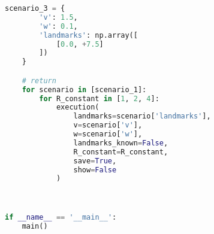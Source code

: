 \documentclass[../CSC_5RO12_TA_TP4.tex]{subfiles}
\begin{document}
\begin{scriptsize}
\begin{lstlisting}[language=Python]
    scenario_3 = {
        'v': 1.5,
        'w': 0.1,
        'landmarks': np.array([
            [0.0, +7.5]
        ])
    }

    # return
    for scenario in [scenario_1]:
        for R_constant in [1, 2, 4]:
            execution(
                landmarks=scenario['landmarks'],
                v=scenario['v'],
                w=scenario['w'],
                landmarks_known=False,
                R_constant=R_constant,
                save=True,
                show=False
            )



if __name__ == '__main__':
    main()
        
	\end{lstlisting}
\end{scriptsize}
\end{document}
